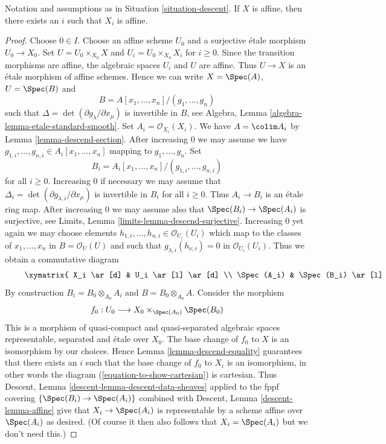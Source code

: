 \begin{lemma}
\label{lemma-limit-is-affine}
Notation and assumptions as in Situation \ref{situation-descent}.
If $X$ is affine, then there exists an $i$ such that $X_i$ is affine.
\end{lemma}

\begin{proof}
Choose $0 \in I$. Choose an affine scheme $U_0$ and a surjective
\'etale morphism $U_0 \to X_0$. Set $U = U_0 \times_{X_0} X$
and $U_i = U_0 \times_{X_0} X_i$ for $i \geq 0$. Since the transition
morphisms are affine, the algebraic spaces $U_i$ and $U$ are affine.
Thus $U \to X$ is an \'etale morphism of affine schemes. Hence we
can write $X = \Spec(A)$, $U = \Spec(B)$ and
$$
B = A[x_1, \ldots, x_n]/(g_1, \ldots, g_n)
$$
such that $\Delta = \det(\partial g_\lambda/\partial x_\mu)$ is invertible
in $B$, see Algebra, Lemma \ref{algebra-lemma-etale-standard-smooth}.
Set $A_i = \mathcal{O}_{X_i}(X_i)$. We have $A = \colim A_i$ by
Lemma \ref{lemma-descend-section}. After increasing $0$ we may assume
we have $g_{1, i}, \ldots, g_{n, i} \in A_i[x_1, \ldots, x_n]$ mapping to
$g_1, \ldots, g_n$. Set
$$
B_i = A_i[x_1, \ldots, x_n]/(g_{1, i}, \ldots, g_{n, i})
$$
for all $i \geq 0$. Increasing $0$ if necessary we may assume that
$\Delta_i = \det(\partial g_{\lambda, i}/\partial x_\mu)$ is invertible
in $B_i$ for all $i \geq 0$. Thus $A_i \to B_i$ is an \'etale ring map.
After increasing $0$ we may assume also that
$\Spec(B_i) \to \Spec(A_i)$ is surjective, see
Limits, Lemma \ref{limits-lemma-descend-surjective}. Increasing
$0$ yet again we may choose elements
$h_{1, i}, \ldots, h_{n, i} \in \mathcal{O}_{U_i}(U_i)$ which map to the
classes of $x_1, \ldots, x_n$ in $B = \mathcal{O}_U(U)$ and such that
$g_{\lambda, i}(h_{\nu, i}) = 0$ in $\mathcal{O}_{U_i}(U_i)$. Thus
we obtain a commutative diagram
\begin{equation}
\label{equation-to-show-cartesian}
\vcenter{
\xymatrix{
X_i \ar[d] & U_i \ar[l] \ar[d] \\
\Spec(A_i) & \Spec(B_i) \ar[l]
}
}
\end{equation}
By construction $B_i = B_0 \otimes_{A_0} A_i$ and
$B = B_0 \otimes_{A_0} A$. Consider the morphism
$$
f_0 : U_0 \longrightarrow X_0 \times_{\Spec(A_0)} \Spec(B_0)
$$
This is a morphism of quasi-compact and quasi-separated algebraic spaces
representable, separated and \'etale over $X_0$. The base change of $f_0$
to $X$ is an isomorphism by our choices. Hence
Lemma \ref{lemma-descend-equality}
guarantees that there exists an $i$ such that the base change of $f_0$
to $X_i$ is an isomorphism, in other words the diagram
(\ref{equation-to-show-cartesian}) is cartesian. Thus
Descent, Lemma \ref{descent-lemma-descent-data-sheaves}
applied to the fppf covering $\{\Spec(B_i) \to \Spec(A_i)\}$
combined with Descent, Lemma \ref{descent-lemma-affine}
give that $X_i \to \Spec(A_i)$ is representable by a scheme
affine over $\Spec(A_i)$ as desired. (Of course it then also follows
that $X_i = \Spec(A_i)$ but we don't need this.)
\end{proof}
